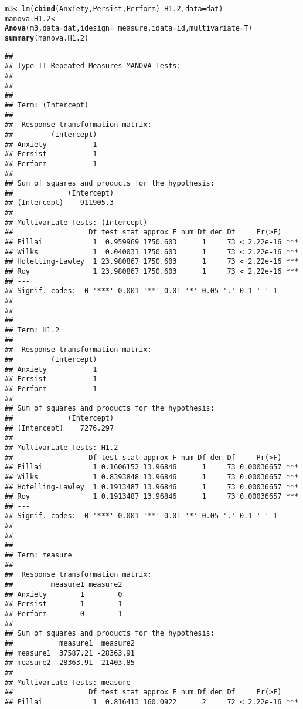 \documentclass{article}\usepackage[]{graphicx}\usepackage[]{color}
\makeatletter
\newcommand{\hlopt}[1]{\textcolor[rgb]{0,0,0}{#1}}%
\newcommand{\hlstd}[1]{\textcolor[rgb]{0.345,0.345,0.345}{#1}}%
\newcommand{\hlkwb}[1]{\textcolor[rgb]{0.69,0.353,0.396}{#1}}%
\newcommand{\hlkwc}[1]{\textcolor[rgb]{0.333,0.667,0.333}{#1}}%
\newcommand{\hlkwd}[1]{\textcolor[rgb]{0.737,0.353,0.396}{\textbf{#1}}}%
\newenvironment{kframe}{%
 \def\at@end@of@kframe{}%
 \ifinner\ifhmode%
  \def\at@end@of@kframe{\end{minipage}}%
  \begin{minipage}{\columnwidth}%
 \fi\fi%
 \def\FrameCommand##1{\hskip\@totalleftmargin \hskip-\fboxsep
 \colorbox{shadecolor}{##1}\hskip-\fboxsep
     \hskip-\linewidth \hskip-\@totalleftmargin \hskip\columnwidth}%
 \MakeFramed {\advance\hsize-\width
   \@totalleftmargin\z@ \linewidth\hsize
   \@setminipage}}%
 {\par\unskip\endMakeFramed%
 \at@end@of@kframe}
\newenvironment{knitrout}{}{} %
\makeatother
\begin{document}
\begin{knitrout}
\begin{kframe}
\begin{alltt}
\hlstd{m3} \hlkwb{<-} \hlkwd{lm}\hlstd{(}\hlkwd{cbind}\hlstd{(Anxiety, Persist, Perform)} \hlopt{~} \hlstd{H1.2,} \hlkwc{data} \hlstd{= dat)}
\hlstd{manova.H1.2} \hlkwb{<-} \hlkwd{Anova}\hlstd{(m3,} \hlkwc{data} \hlstd{= dat,} \hlkwc{idesign} \hlstd{=} \hlopt{~}\hlstd{measure,} \hlkwc{idata} \hlstd{= id,} \hlkwc{multivariate} \hlstd{= T)}
\hlkwd{summary}\hlstd{(manova.H1.2)}
\end{alltt}
\begin{verbatim}
## 
## Type II Repeated Measures MANOVA Tests:
## 
## ------------------------------------------
##  
## Term: (Intercept) 
## 
##  Response transformation matrix:
##         (Intercept)
## Anxiety           1
## Persist           1
## Perform           1
## 
## Sum of squares and products for the hypothesis:
##             (Intercept)
## (Intercept)    911905.3
## 
## Multivariate Tests: (Intercept)
##                  Df test stat approx F num Df den Df     Pr(>F)    
## Pillai            1  0.959969 1750.603      1     73 < 2.22e-16 ***
## Wilks             1  0.040031 1750.603      1     73 < 2.22e-16 ***
## Hotelling-Lawley  1 23.980867 1750.603      1     73 < 2.22e-16 ***
## Roy               1 23.980867 1750.603      1     73 < 2.22e-16 ***
## ---
## Signif. codes:  0 '***' 0.001 '**' 0.01 '*' 0.05 '.' 0.1 ' ' 1
## 
## ------------------------------------------
##  
## Term: H1.2 
## 
##  Response transformation matrix:
##         (Intercept)
## Anxiety           1
## Persist           1
## Perform           1
## 
## Sum of squares and products for the hypothesis:
##             (Intercept)
## (Intercept)    7276.297
## 
## Multivariate Tests: H1.2
##                  Df test stat approx F num Df den Df     Pr(>F)    
## Pillai            1 0.1606152 13.96846      1     73 0.00036657 ***
## Wilks             1 0.8393848 13.96846      1     73 0.00036657 ***
## Hotelling-Lawley  1 0.1913487 13.96846      1     73 0.00036657 ***
## Roy               1 0.1913487 13.96846      1     73 0.00036657 ***
## ---
## Signif. codes:  0 '***' 0.001 '**' 0.01 '*' 0.05 '.' 0.1 ' ' 1
## 
## ------------------------------------------
##  
## Term: measure 
## 
##  Response transformation matrix:
##         measure1 measure2
## Anxiety        1        0
## Persist       -1       -1
## Perform        0        1
## 
## Sum of squares and products for the hypothesis:
##           measure1  measure2
## measure1  37587.21 -28363.91
## measure2 -28363.91  21403.85
## 
## Multivariate Tests: measure
##                  Df test stat approx F num Df den Df     Pr(>F)    
## Pillai            1  0.816413 160.0922      2     72 < 2.22e-16 ***

\end{verbatim}
\end{kframe}
\end{knitrout}
\end{document}
